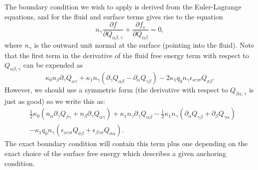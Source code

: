 The boundary condition we wish to apply is derived from the Euler-Lagrange
equations, and for the fluid and surface terms gives rise to the equation
\begin{equation}
n_\gamma \frac{\partial f}{\partial Q_{\alpha\beta,\gamma}}
+ \frac{\partial f_s}{\partial Q_{\alpha\beta}} = 0,
\label{equation-lc-general-bc}
\end{equation}
where $n_\gamma$ is the outward unit normal at the surface (pointing into
the fluid). Note that the first term in the derivative of the fluid free
energy term with respect to
$Q_{\alpha\beta,\gamma}$ can be expended as
\begin{equation}
\kappa_0 n_\beta \partial_\gamma Q_{\alpha\gamma}
+ \kappa_1 n_\gamma
(\partial_\gamma Q_{\alpha\beta} - \partial_\alpha Q_{\gamma\beta})
- 2\kappa_1 q_0 n_\gamma \epsilon_{\alpha\gamma\sigma} Q_{\sigma\beta}.
\nonumber
\end{equation}
However, we should use a symmetric form (the derivative with respect to
$Q_{\beta\alpha,\gamma}$ is just as good) so we write this as:
\begin{eqnarray}
&
{\textstyle\frac{1}{2}} \kappa_0 (n_\alpha \partial_\gamma Q_{\beta\gamma}
+ n_\beta \partial_\gamma Q_{\alpha\gamma})
+ \kappa_1 n_\gamma \partial_\gamma Q_{\alpha\beta}
- {\textstyle\frac{1}{2}} \kappa_1 n_\gamma ( \partial_\alpha Q_{\gamma\beta}
+ \partial_\beta Q_{\gamma\alpha})
\nonumber
\\
&
- \kappa_1 q_0 n_\gamma (\epsilon_{\alpha\gamma\sigma} Q_{\sigma\beta}
+ \epsilon_{\beta\gamma\sigma}Q_{\sigma\alpha}).
\nonumber
\end{eqnarray}
The exact boundary condition will contain this term plus one
depending on the exact choice of the surface free energy which
describes a given anchoring condition.


